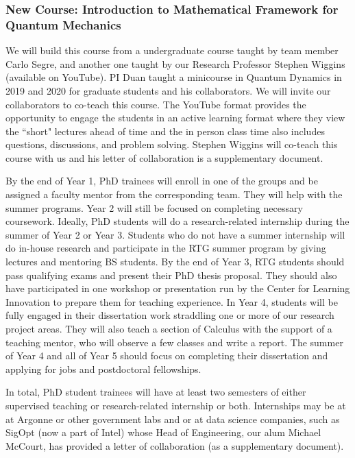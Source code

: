 \documentclass[11pt]{NSFamsart}
\begin{document}
\subsubsection*{New Course: Introduction to Mathematical Framework for Quantum Mechanics} We will build this course from  a   undergraduate course   taught by team member Carlo Segre, and another one taught by our Research Professor Stephen Wiggins (available on YouTube). PI Duan   taught a minicourse in Quantum Dynamics \cite{Gutzwiller1990ChaosIC, Holland1993TheQT,Lindgren2019QuantumMC,Micha2006QuantumDW} in 2019 and 2020 for graduate students and his collaborators.  We will invite our collaborators to co-teach this course. 
The YouTube format provides the opportunity to engage the students in an active learning format where they view the “short" lectures ahead of time and the in person class time  also includes  questions, discussions, and problem solving. Stephen Wiggins will co-teach this course with us and his letter of collaboration is a supplementary document.

By the end of Year 1, PhD trainees will enroll in one of the groups and be assigned a faculty mentor from the corresponding team. They will   help with the summer programs.   Year 2
will still be focused on completing necessary coursework.
Ideally, PhD students will do a research-related internship during the summer of Year 2 or Year 3. Students who do not have
a summer internship will do in-house research and participate in the RTG summer program
by giving lectures and mentoring BS students. By the end of Year 3, RTG students
should pass qualifying exams and present their PhD thesis proposal. They should also have participated in one   workshop or presentation run by the Center for Learning Innovation to prepare them for teaching experience. In Year 4, students will be fully engaged in their dissertation work straddling one or more of our research project areas. They will also teach a section of Calculus with the support of a teaching
mentor, who will observe a few classes and write a report. The summer of Year 4 and all of Year 5 should focus on completing their dissertation and applying for jobs and postdoctoral fellowships.

In total, PhD student trainees will have at least two semesters of either supervised teaching or research-related internship or both.  Internships may be at at Argonne or other government labs and or at data science companies, such as SigOpt (now a part of Intel) whose Head of Engineering, our alum Michael McCourt, has provided a letter  of collaboration (as a supplementary document).
\end{document}
